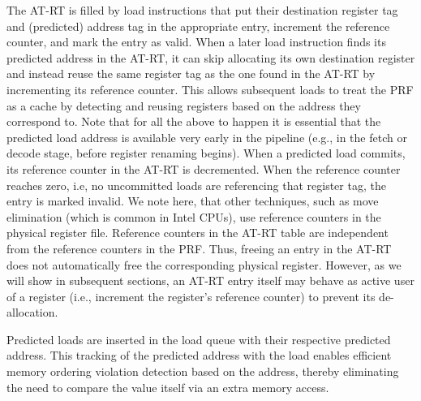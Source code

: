 \documentclass{sig-alternate}
\begin{document}
The AT-RT is filled by load instructions that put their destination register tag and (predicted) address tag in the appropriate entry, increment the reference counter, and mark the entry as valid. When a later load instruction finds its predicted address in the AT-RT, it can skip allocating its own destination register and instead reuse the same register tag as the one found in the AT-RT by incrementing its reference counter. This allows subsequent loads to treat the PRF as a cache by detecting and reusing registers based on the address they correspond to.
Note that for all the above to happen it is essential that the predicted load address is available very early in the pipeline (e.g., in the fetch or decode stage, before register renaming begins).
When a predicted load commits, its reference counter in the AT-RT is decremented. When the reference counter reaches zero, i.e, no uncommitted loads are referencing that register tag, the entry is marked invalid.  We note here, that other techniques, such as move elimination (which is common in Intel CPUs), use reference counters in the physical register file. Reference counters in the AT-RT table are independent from the reference counters in the PRF. Thus, freeing an entry in the AT-RT does not automatically free the corresponding physical register. However, as we will show in subsequent sections, an AT-RT entry itself may behave as active user of a register (i.e., increment the register's reference counter) to prevent its de-allocation. 


Predicted loads are inserted in the load queue with their respective predicted address. This tracking of the predicted address with the load enables efficient memory ordering violation detection based on the address, thereby eliminating the need to compare the value itself via an extra memory access. %
\end{document}
